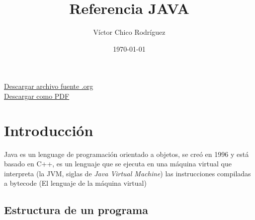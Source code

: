 \documentclass[11pt]{article}
\author{Víctor Chico Rodríguez}
\date{\today}
\title{Referencia JAVA}
\begin{document}
\maketitle
\tableofcontents

\href{./referenciajava.org}{Descargar archivo fuente .org}\\
\href{./referenciajava.pdf}{Descargar como PDF}

\section{Introducción}
\label{sec:org0e8f175}
Java es un lenguage de programación orientado a objetos, se creó en 1996 y está basado en C++, es un lenguaje que se ejecuta en una máquina virtual que interpreta (la JVM, siglas de \emph{Java Virtual Machine}) las instrucciones compiladas a bytecode (El lenguaje de la máquina virtual)
\subsection{Estructura de un programa}
\label{sec:orge87c961}
\end{document}
